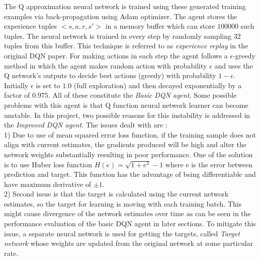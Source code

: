 \documentclass{article}
\begin{document}
The Q approximation neural network is trained using these generated training examples via back-propagation using Adam\cite{adam} optimizer. The agent stores the experience tuples $<s, a, r, s'>$ in a memory buffer which can store $100000$ such tuples. The neural network is trained in every step by randomly sampling 32 tuples from this buffer. This technique is referred to as \textit{experience replay} in the original DQN paper. For making actions in each step the agent follows a $\epsilon$-greedy method in which the agent makes random action with probability $\epsilon$ and uses the Q network's outputs to decide best actions (greedy) with probability $1-\epsilon$. Initially $\epsilon$ is set to $1.0$ (full exploration) and then decayed exponentially by a factor of $0.975$. All of these constitute the \textit{Basic DQN agent}. Some possible problems with this agent is that Q function neural network learner can become unstable. In this project, two possible reasons for this instability is addressed in the \textit{Improved DQN agent}. The issues dealt with are :\\1) Due to use of mean squared error loss function, if the training sample does not align with current estimates, the gradients produced will be high and alter the network weights substantially resulting in poor performance. One of the solution is to use Huber loss function $H(e) = \sqrt{1+e^2} - 1$ where e is the error between prediction and target. This function has the advantage of being differentiable and have maximum derivative of $\pm1$.\\2) Second issue is that the target is calculated using the current network estimates, so the target for learning is moving with each training batch. This might cause divergence of the network estimates over time as can be seen in the performance evaluation of the basic DQN agent in later sections. To mitigate this issue, a separate neural network is used for getting the targets, called \textit{Target network} whose weights are updated from the original network at some particular rate.
\end{document}
